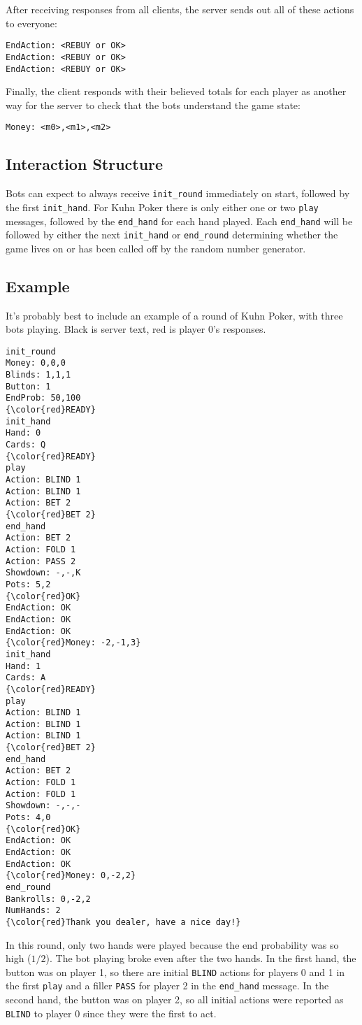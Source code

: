 \documentclass{article}
\begin{document}
After receiving responses from all clients, the server sends out
all of these actions to everyone:
\begin{verbatim}
EndAction: <REBUY or OK>
EndAction: <REBUY or OK>
EndAction: <REBUY or OK>
\end{verbatim}

Finally, the client responds with their believed totals for each player
as another way for the server to check that the bots understand the
game state:
\begin{verbatim}
Money: <m0>,<m1>,<m2>
\end{verbatim}

\subsection{Interaction Structure}
Bots can expect to always receive \texttt{init\_round} immediately
on start, followed by the first \texttt{init\_hand}. For Kuhn Poker
there is only either one or two \texttt{play} messages, followed
by the \texttt{end\_hand} for each hand played. Each \texttt{end\_hand}
will be followed by either the next \texttt{init\_hand} or \texttt{end\_round}
determining whether the game lives on or has been called off by
the random number generator.

\subsection{Example}
It's probably best to include an example of a round of Kuhn Poker,
with three bots playing. Black is server text, red is player 0's
responses.
\begin{Verbatim}[commandchars=\\\{\}]
init_round
Money: 0,0,0
Blinds: 1,1,1
Button: 1
EndProb: 50,100
{\color{red}READY}
init_hand
Hand: 0
Cards: Q
{\color{red}READY}
play
Action: BLIND 1
Action: BLIND 1
Action: BET 2
{\color{red}BET 2}
end_hand
Action: BET 2
Action: FOLD 1
Action: PASS 2
Showdown: -,-,K
Pots: 5,2
{\color{red}OK}
EndAction: OK
EndAction: OK
EndAction: OK
{\color{red}Money: -2,-1,3}
init_hand
Hand: 1
Cards: A
{\color{red}READY}
play
Action: BLIND 1
Action: BLIND 1
Action: BLIND 1
{\color{red}BET 2}
end_hand
Action: BET 2
Action: FOLD 1
Action: FOLD 1
Showdown: -,-,-
Pots: 4,0
{\color{red}OK}
EndAction: OK
EndAction: OK
EndAction: OK
{\color{red}Money: 0,-2,2}
end_round
Bankrolls: 0,-2,2
NumHands: 2
{\color{red}Thank you dealer, have a nice day!}
\end{Verbatim}
In this round, only two hands were played because the end probability
was so high ($1/2$). The bot playing broke even after the two hands.
In the first hand, the button was on player 1, so there are initial
\texttt{BLIND} actions for players 0 and 1 in the first \texttt{play}
and a filler \texttt{PASS} for player 2 in the \texttt{end\_hand} message.
In the second hand, the button was on player 2, so all initial actions
were reported as \texttt{BLIND} to player 0 since they were the first to
act.
\end{document}
